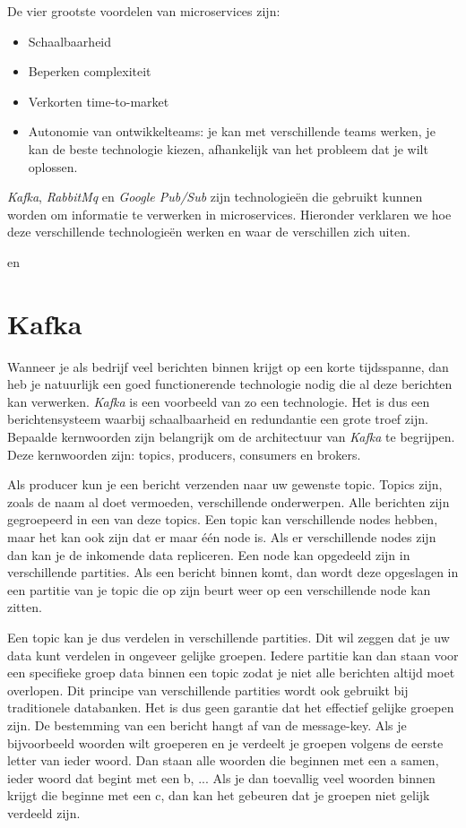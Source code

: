 De vier grootste voordelen van microservices zijn: 
\begin{itemize}
    \item Schaalbaarheid
    \item Beperken complexiteit
    \item Verkorten time-to-market
    \item Autonomie van ontwikkelteams: je kan met verschillende teams werken, je kan de beste technologie kiezen, afhankelijk van het probleem dat je wilt oplossen.
\end{itemize}

\emph{Kafka}, \emph{RabbitMq} en \emph{Google Pub/Sub} zijn technologieën die gebruikt kunnen worden om informatie te verwerken in microservices. Hieronder verklaren we hoe deze verschillende technologieën werken en waar de verschillen zich uiten.

 \autocite{Claudio2017} en \autocite{Velthoven2016}

\section{Kafka}

Wanneer je als bedrijf veel berichten binnen krijgt op een korte tijdsspanne, dan heb je natuurlijk een goed functionerende technologie nodig die al deze berichten kan verwerken. \emph{Kafka} is een voorbeeld van zo een technologie. Het is dus een berichtensysteem waarbij schaalbaarheid en redundantie een grote troef zijn. Bepaalde kernwoorden zijn belangrijk om de architectuur van \emph{Kafka} te begrijpen. Deze kernwoorden zijn: topics, producers, consumers en brokers.  

Als producer kun je een bericht verzenden naar uw gewenste topic. Topics zijn, zoals de naam al doet vermoeden, verschillende onderwerpen. Alle berichten zijn gegroepeerd in een van deze topics. Een topic kan verschillende nodes hebben, maar het kan ook zijn dat er maar één node is. Als er verschillende nodes zijn dan kan je de inkomende data repliceren. Een node kan opgedeeld zijn in verschillende partities. Als een bericht binnen komt, dan wordt deze opgeslagen in een partitie van je topic die op zijn beurt weer op een verschillende node kan zitten.

Een topic kan je dus verdelen in verschillende partities. Dit wil zeggen dat je uw data kunt verdelen in ongeveer gelijke groepen. Iedere partitie kan dan staan voor een specifieke groep data binnen een topic zodat je niet alle berichten altijd moet overlopen. Dit principe van verschillende partities wordt ook gebruikt bij traditionele databanken. Het is dus geen garantie dat het effectief gelijke groepen zijn. De bestemming van een bericht hangt af van de message-key. Als je bijvoorbeeld woorden wilt groeperen en je verdeelt je groepen volgens de eerste letter van ieder woord. Dan staan alle woorden die beginnen met een a samen, ieder woord dat begint met een b, ... Als je dan toevallig veel woorden binnen krijgt die beginne met een c, dan kan het gebeuren dat je groepen niet gelijk verdeeld zijn.

